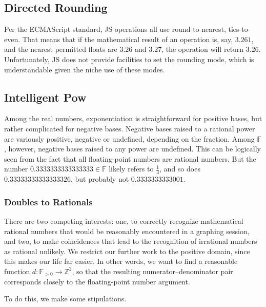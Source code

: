 \documentclass{article}
\newcommand{\finitefp}{\mathbb{F}}
\begin{document}
\subsection{Directed Rounding}

Per the ECMAScript standard, JS operations all use round-to-nearest, ties-to-even. That means that if the mathematical result of an operation is, say, $3.261$, and the nearest permitted floats are $3.26$ and $3.27$, the operation will return $3.26$. Unfortunately, JS does not provide facilities to set the rounding mode, which is understandable given the niche use of these modes.

\subsection{Intelligent Pow}

Among the real numbers, exponentiation is straightforward for positive bases, but rather complicated for negative bases. Negative bases raised to a rational power are variously positive, negative or undefined, depending on the fraction. Among $\finitefp$, however, negative bases raised to any power are undefined. This can be logically seen from the fact that all floating-point numbers are rational numbers. But the number $0.3333333333333333\in\finitefp$ likely refers to $\frac{1}{3}$, and so does $0.33333333333333326$, but probably not $0.3333333333001$.

\subsubsection{Doubles to Rationals}

There are two competing interests: one, to correctly recognize mathematical rational numbers that would be reasonably encountered in a graphing session, and two, to make coincidences that lead to the recognition of irrational numbers as rational unlikely. We restrict our further work to the positive domain, since this makes our life far easier. In other words, we want to find a reasonable function $d : \finitefp_{>0} \to \mathbb{Z}^2$, so that the resulting numerator–denominator pair corresponds closely to the floating-point number argument.

To do this, we make some stipulations.
\end{document}

